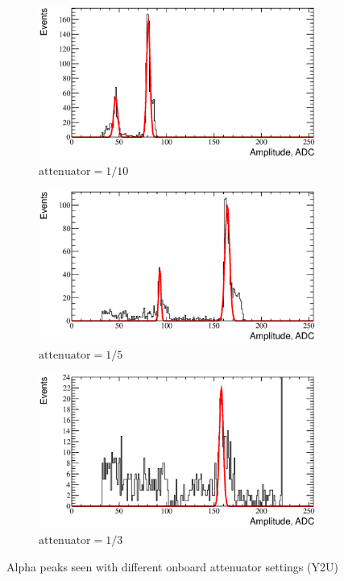 \documentclass[a4paper,12pt]{article}
\begin{document}
\begin{figure}[p]
\begin{subfigure}[b]{0.3\textwidth}
\includegraphics[width=\textwidth]{gfx/atten_1_over_10_ch06.eps}
\caption{$\text{attenuator}=1/10$}
\end{subfigure}
\begin{subfigure}[b]{0.3\textwidth}
\includegraphics[width=\textwidth]{gfx/atten_1_over_5_ch06.eps}
\caption{$\text{attenuator}=1/5$}
\end{subfigure}
\begin{subfigure}[b]{0.3\textwidth}
\includegraphics[width=\textwidth]{gfx/atten_1_over_3_ch06.eps}
\caption{$\text{attenuator}=1/3$}
\end{subfigure}
\caption{Alpha peaks seen with different onboard attenuator settings (Y2U)}
\label{fig:atten_distrib}
\end{figure}
\end{document}
